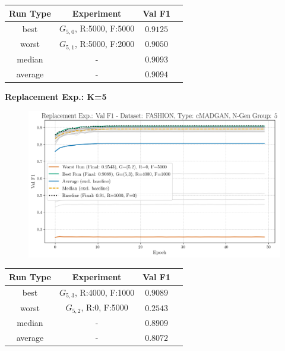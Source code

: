 \begin{table}[H]
	\vspace{-1em}
	\centering
	\begin{tabular}{|c|c|c|c|}
		\hline
		Run Type & Experiment & Val F1 \\ \hline
		best & \(G_{5, 0}\), R:5000, F:5000 & $0.9125$\\ \hline
		worst & \(G_{5, 1}\), R:5000, F:2000 & $0.9050$\\ \hline
		median & - & $0.9093$\\ \hline
		average & - & $0.9094$
		\\ \hline
	\end{tabular}
\end{table}
\noindent\textbf{Replacement Exp.: K=5}
\begin{figure}[htbp]
	\centering
	\includegraphics[width=.85\textwidth]{abb/strat_classifier_performance/FASHION_STRATIFIED_CLASSIFIERS_cMADGAN_NEW/replacement_experiments/val_f1_score_cMADGAN_FASHION_n_gen_5_all.png}
	\label{fig:app_strat_class_performance_replacement_exp._val_f1_score_5}
\end{figure}
\begin{table}[H]
	\vspace{-1em}
	\centering
	\begin{tabular}{|c|c|c|c|}
		\hline
		Run Type & Experiment & Val F1 \\ \hline
		best & \(G_{5, 3}\), R:4000, F:1000 & $0.9089$\\ \hline
		worst & \(G_{5, 2}\), R:0, F:5000 & $0.2543$\\ \hline
		median & - & $0.8909$\\ \hline
		average & - & $0.8072$
		\\ \hline
	\end{tabular}
\end{table}
